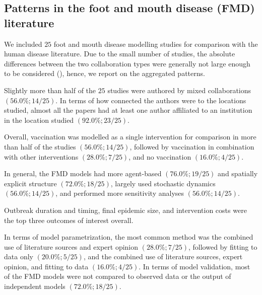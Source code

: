 \documentclass[10pt,letterpaper]{article}
\begin{document}
\subsection*{Patterns in the foot and mouth disease (FMD) literature}
We included $25$ foot and mouth disease modelling studies for comparison with the human disease literature. Due to the small number of studies, the absolute differences between the two collaboration types were generally not large enough to be considered (), hence, we report on the aggregated patterns. 

Slightly more than half of the $25$ studies were authored by mixed collaborations $(56.0\%; 14/25)$. In terms of how connected the authors were to the locations studied, almost all the papers had at least one author affiliated to an institution in the location studied $(92.0\%; 23/25)$. 

Overall, vaccination was modelled as a single intervention for comparison in more than half of the studies $(56.0\%; 14/25)$, followed by vaccination in combination with other interventions $(28.0\%; 7/25)$, and no vaccination $(16.0\%; 4/25)$.  

In general, the FMD models had more agent-based $(76.0\%; 19/25)$ and spatially explicit structure $(72.0\%; 18/25)$, largely used stochastic dynamics $(56.0\%; 14/25)$, and performed more sensitivity analyses $(56.0\%; 14/25)$. 

Outbreak duration and timing, final epidemic size, and intervention costs were the top three outcomes of interest overall. 

In terms of model parametrization, the most common method was the combined use of literature sources and expert opinion $(28.0\%; 7/25)$, followed by fitting to data only $(20.0\%; 5/25)$, and the combined use of literature sources, expert opinion, and fitting to data $(16.0\%; 4/25)$. In terms of model validation, most of the FMD models were not compared to observed data or the output of independent models $(72.0\%; 18/25)$. 
\end{document}
